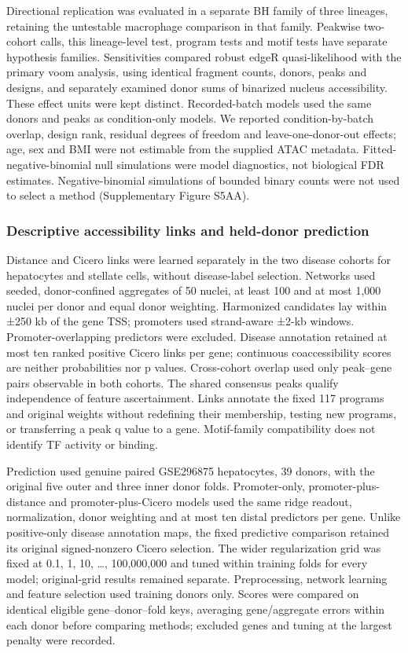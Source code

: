 Directional replication was evaluated in a separate BH family of three lineages, retaining the untestable macrophage comparison in that family. Peakwise two-cohort calls, this lineage-level test, program tests and motif tests have separate hypothesis families. Sensitivities compared robust edgeR quasi-likelihood with the primary voom analysis, using identical fragment counts, donors, peaks and designs, and separately examined donor sums of binarized nucleus accessibility. These effect units were kept distinct. Recorded-batch models used the same donors and peaks as condition-only models. We reported condition-by-batch overlap, design rank, residual degrees of freedom and leave-one-donor-out effects; age, sex and BMI were not estimable from the supplied ATAC metadata. Fitted-negative-binomial null simulations were model diagnostics, not biological FDR estimates. Negative-binomial simulations of bounded binary counts were not used to select a method (Supplementary Figure S5AA).

\subsubsection{Descriptive accessibility links and held-donor prediction}\label{descriptive-accessibility-links-and-held-donor-prediction}

Distance and Cicero links were learned separately in the two disease cohorts for hepatocytes and stellate cells, without disease-label selection. Networks used seeded, donor-confined aggregates of 50 nuclei, at least 100 and at most 1,000 nuclei per donor and equal donor weighting. Harmonized candidates lay within ±250 kb of the gene TSS; promoters used strand-aware ±2-kb windows. Promoter-overlapping predictors were excluded. Disease annotation retained at most ten ranked positive Cicero links per gene; continuous coaccessibility scores are neither probabilities nor p values. Cross-cohort overlap used only peak--gene pairs observable in both cohorts. The shared consensus peaks qualify independence of feature ascertainment. Links annotate the fixed 117 programs and original weights without redefining their membership, testing new programs, or transferring a peak q value to a gene. Motif-family compatibility does not identify TF activity or binding.

Prediction used genuine paired GSE296875 hepatocytes, 39 donors, with the original five outer and three inner donor folds. Promoter-only, promoter-plus-distance and promoter-plus-Cicero models used the same ridge readout, normalization, donor weighting and at most ten distal predictors per gene. Unlike positive-only disease annotation maps, the fixed predictive comparison retained its original signed-nonzero Cicero selection. The wider regularization grid was fixed at 0.1, 1, 10, \ldots, 100,000,000 and tuned within training folds for every model; original-grid results remained separate. Preprocessing, network learning and feature selection used training donors only. Scores were compared on identical eligible gene--donor--fold keys, averaging gene/aggregate errors within each donor before comparing methods; excluded genes and tuning at the largest penalty were recorded.

